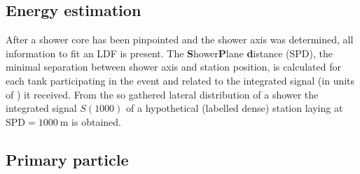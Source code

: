 \subsection{Energy estimation}
\label{ssec:energy-estimation}

After a shower core has been pinpointed and the shower axis was determined, all information to fit an LDF is present. The \textbf{S}hower\textbf{P}lane 
\textbf{d}istance (SPD), the minimal separation between shower axis and station position, is calculated for each tank participating in the event and related to the
integrated signal (in units of \Charge) it received. From the so gathered lateral distribution of a shower the integrated signal $S(1000)$ of a hypothetical 
(labelled dense) station laying at $\text{SPD} = \SI{1000}{\meter}$ is obtained. 


\subsection{Primary particle}
\label{ssec:primary-particle}

